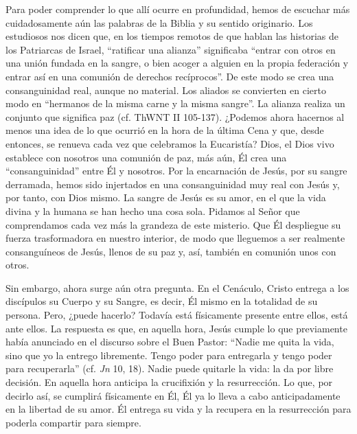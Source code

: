 			\begin{body}Para poder comprender lo que allí ocurre en profundidad, hemos de escuchar más cuidadosamente aún las palabras de la Biblia y su sentido originario. Los estudiosos nos dicen que, en los tiempos remotos de que hablan las historias de los Patriarcas de Israel, “ratificar una alianza” significaba “entrar con otros en una unión fundada en la sangre, o bien acoger a alguien en la propia federación y entrar así en una comunión de derechos recíprocos”. De este modo se crea una consanguinidad real, aunque no material. Los aliados se convierten en cierto modo en “hermanos de la misma carne y la misma sangre”. La alianza realiza un conjunto que significa paz (cf. ThWNT II 105-137). ¿Podemos ahora hacernos al menos una idea de lo que ocurrió en la hora de la última Cena y que, desde entonces, se renueva cada vez que celebramos la Eucaristía? Dios, el Dios vivo establece con nosotros una comunión de paz, más aún, Él crea una “consanguinidad” entre Él y nosotros. Por la encarnación de Jesús, por su sangre derramada, hemos sido injertados en una consanguinidad muy real con Jesús y, por tanto, con Dios mismo. La sangre de Jesús es su amor, en el que la vida divina y la humana se han hecho una cosa sola. Pidamos al Señor que comprendamos cada vez más la grandeza de este misterio. Que Él despliegue su fuerza trasformadora en nuestro interior, de modo que lleguemos a ser realmente consanguíneos de Jesús, llenos de su paz y, así, también en comunión unos con otros.\end{body}
			
			\begin{body}Sin embargo, ahora surge aún otra pregunta. En el Cenáculo, Cristo entrega a los discípulos su Cuerpo y su Sangre, es decir, Él mismo en la totalidad de su persona. Pero, ¿puede hacerlo? Todavía está físicamente presente entre ellos, está ante ellos. La respuesta es que, en aquella hora, Jesús cumple lo que previamente había anunciado en el discurso sobre el Buen Pastor: “Nadie me quita la vida, sino que yo la entrego libremente. Tengo poder para entregarla y tengo poder para recuperarla” (cf. \textit{Jn} 10, 18). Nadie puede quitarle la vida: la da por libre decisión. En aquella hora anticipa la crucifixión y la resurrección. Lo que, por decirlo así, se cumplirá físicamente en Él, Él ya lo lleva a cabo anticipadamente en la libertad de su amor. Él entrega su vida y la recupera en la resurrección para poderla compartir para siempre.\end{body}
			

